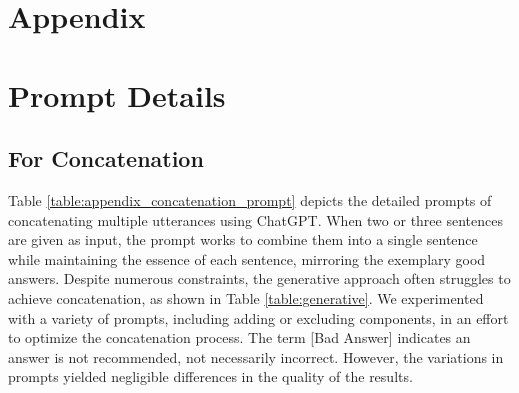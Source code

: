 \section*{Appendix}

\section{Prompt Details}
\subsection{For Concatenation}
\label{subsec:prompt_concat}
Table \ref{table:appendix_concatenation_prompt} depicts the detailed prompts of concatenating multiple utterances using ChatGPT. 
When two or three sentences are given as input, the prompt works to combine them into a single sentence while maintaining the essence of each sentence, mirroring the exemplary good answers. 
Despite numerous constraints, the generative approach often struggles to achieve concatenation, as shown in Table \ref{table:generative}.
We experimented with a variety of prompts, including adding or excluding components, in an effort to optimize the concatenation process. 
The term [Bad Answer] indicates an answer is not recommended, not necessarily incorrect.
However, the variations in prompts yielded negligible differences in the quality of the results.

